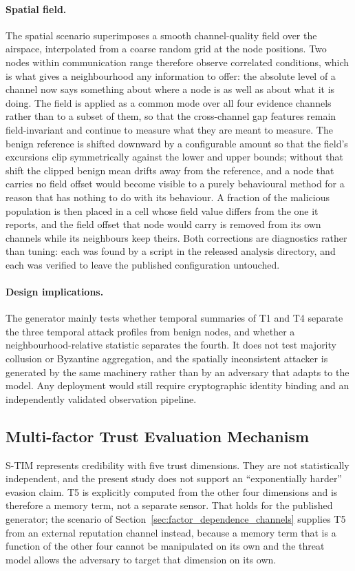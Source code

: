 \documentclass[notspecified,article,submit,moreauthors]{Definitions/mdpi}
\begin{document}
\paragraph{Spatial field.}
The spatial scenario superimposes a smooth channel-quality field over the airspace, interpolated from a coarse random grid at the node positions. Two nodes within communication range therefore observe correlated conditions, which is what gives a neighbourhood any information to offer: the absolute level of a channel now says something about where a node is as well as about what it is doing. The field is applied as a common mode over all four evidence channels rather than to a subset of them, so that the cross-channel gap features remain field-invariant and continue to measure what they are meant to measure. The benign reference is shifted downward by a configurable amount so that the field's excursions clip symmetrically against the lower and upper bounds; without that shift the clipped benign mean drifts away from the reference, and a node that carries no field offset would become visible to a purely behavioural method for a reason that has nothing to do with its behaviour. A fraction of the malicious population is then placed in a cell whose field value differs from the one it reports, and the field offset that node would carry is removed from its own channels while its neighbours keep theirs. Both corrections are diagnostics rather than tuning: each was found by a script in the released analysis directory, and each was verified to leave the published configuration untouched.

\paragraph{Design implications.}
The generator mainly tests whether temporal summaries of T1 and T4 separate the three temporal attack profiles from benign nodes, and whether a neighbourhood-relative statistic separates the fourth. It does not test majority collusion or Byzantine aggregation, and the spatially inconsistent attacker is generated by the same machinery rather than by an adversary that adapts to the model. Any deployment would still require cryptographic identity binding and an independently validated observation pipeline.

\subsection{Multi-factor Trust Evaluation Mechanism}
\label{sec:trust_eval}
S-TIM represents credibility with five trust dimensions. They are not statistically independent, and the present study does not support an ``exponentially harder'' evasion claim. T5 is explicitly computed from the other four dimensions and is therefore a memory term, not a separate sensor. That holds for the published generator; the scenario of Section~\ref{sec:factor_dependence_channels} supplies T5 from an external reputation channel instead, because a memory term that is a function of the other four cannot be manipulated on its own and the threat model allows the adversary to target that dimension on its own.
\end{document}
